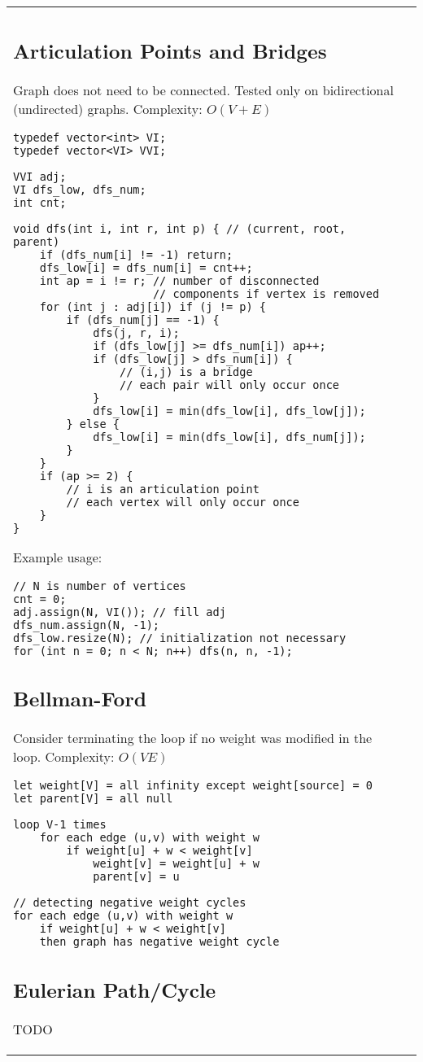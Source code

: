 \documentclass[letterpaper]{article}
\begin{document}
\begin{tabular}{@{}p{9cm}p{9cm}@{}}
\subsection{Articulation Points and Bridges}
Graph does not need to be connected. Tested only on bidirectional (undirected) graphs. Complexity: $O\left(V + E\right)$

\begin{lstlisting}
typedef vector<int> VI;
typedef vector<VI> VVI;

VVI adj;
VI dfs_low, dfs_num;
int cnt;

void dfs(int i, int r, int p) { // (current, root, parent)
	if (dfs_num[i] != -1) return;
	dfs_low[i] = dfs_num[i] = cnt++;
	int ap = i != r; // number of disconnected
	                 // components if vertex is removed
	for (int j : adj[i]) if (j != p) {
		if (dfs_num[j] == -1) {
			dfs(j, r, i);
			if (dfs_low[j] >= dfs_num[i]) ap++;
			if (dfs_low[j] > dfs_num[i]) {
				// (i,j) is a bridge
				// each pair will only occur once
			}
			dfs_low[i] = min(dfs_low[i], dfs_low[j]);
		} else {
			dfs_low[i] = min(dfs_low[i], dfs_num[j]);
		}
	}
	if (ap >= 2) {
		// i is an articulation point
		// each vertex will only occur once
	}
}
\end{lstlisting}

Example usage:
\begin{lstlisting}
// N is number of vertices
cnt = 0;
adj.assign(N, VI()); // fill adj
dfs_num.assign(N, -1);
dfs_low.resize(N); // initialization not necessary
for (int n = 0; n < N; n++) dfs(n, n, -1);
\end{lstlisting}

\subsection{Bellman-Ford}

Consider terminating the loop if no weight was modified in the loop. Complexity: $O(VE)$

\begin{lstlisting}
let weight[V] = all infinity except weight[source] = 0
let parent[V] = all null

loop V-1 times
	for each edge (u,v) with weight w
		if weight[u] + w < weight[v]
			weight[v] = weight[u] + w
			parent[v] = u

// detecting negative weight cycles
for each edge (u,v) with weight w
	if weight[u] + w < weight[v]
	then graph has negative weight cycle
\end{lstlisting}

\subsection{Eulerian Path/Cycle}

TODO

\end{tabular}
\end{document}
